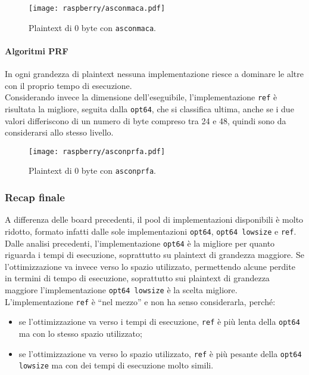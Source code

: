 \begin{figure}[H]
    \centering
    \texttt{[image: raspberry/asconmaca.pdf]}
    \caption{Plaintext di 0 byte con \texttt{asconmaca}.}
\end{figure}

\paragraph{Algoritmi PRF}

In ogni grandezza di plaintext nessuna implementazione riesce a dominare le altre con il proprio tempo di esecuzione. \\

\noindent Considerando invece la dimensione dell'eseguibile, l'implementazione \texttt{ref} è risultata la migliore, seguita dalla \texttt{opt64}, che si classifica ultima, anche se i due valori differiscono di un numero di byte compreso tra 24 e 48, quindi sono da considerarsi allo stesso livello.

\begin{figure}[H]
    \centering
    \texttt{[image: raspberry/asconprfa.pdf]}
    \caption{Plaintext di 0 byte con \texttt{asconprfa}.}
\end{figure}

\subsubsection{Recap finale}

A differenza delle board precedenti, il pool di implementazioni disponibili è molto ridotto, formato infatti dalle sole implementazioni \texttt{opt64}, \texttt{opt64 lowsize} e \texttt{ref}. Dalle analisi precedenti, l'implementazione \texttt{opt64} è la migliore per quanto riguarda i tempi di esecuzione, soprattutto su plaintext di grandezza maggiore. Se l'ottimizzazione va invece verso lo spazio utilizzato, permettendo alcune perdite in termini di tempo di esecuzione, soprattutto sui plaintext di grandezza maggiore l'implementazione \texttt{opt64 lowsize} è la scelta migliore. L'implementazione \texttt{ref} è ``nel mezzo'' e non ha senso considerarla, perché: \begin{itemize}
    \item se l'ottimizzazione va verso i tempi di esecuzione, \texttt{ref} è più lenta della \texttt{opt64} ma con lo stesso spazio utilizzato;
    \item se l'ottimizzazione va verso lo spazio utilizzato, \texttt{ref} è più pesante della \texttt{opt64 lowsize} ma con dei tempi di esecuzione molto simili.
\end{itemize}
